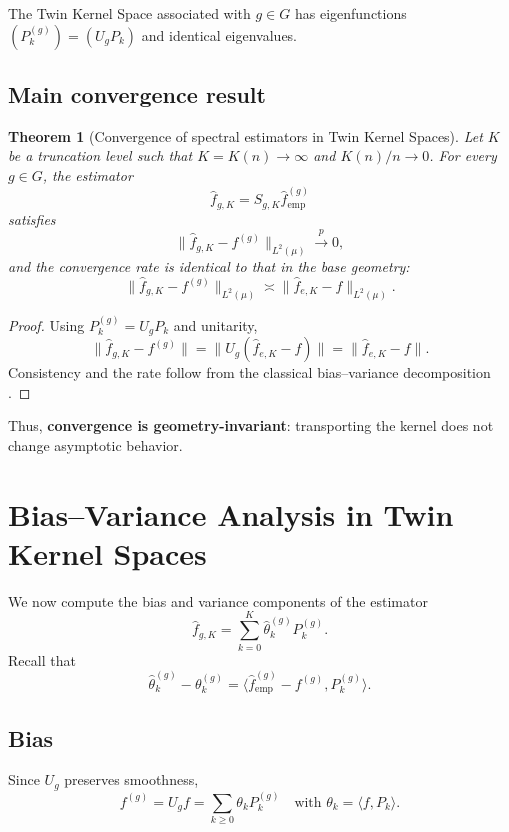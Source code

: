 \documentclass[11pt,a4paper]{article}
\newtheorem{theorem}{Theorem}[section]
\newcommand{\ip}[2]{\langle #1, #2 \rangle}
\begin{document}
The Twin Kernel Space associated with $g \in G$ has eigenfunctions $(P_k^{(g)}) = (U_g P_k)$ and identical eigenvalues.

\subsection{Main convergence result}

\begin{theorem}[Convergence of spectral estimators in Twin Kernel Spaces]\label{thm:convergence}
Let $K$ be a truncation level such that $K = K(n) \to \infty$ and $K(n)/n \to 0$. For every $g \in G$, the estimator
\[
\hat{f}_{g,K} = S_{g,K} \hat{f}_{\mathrm{emp}}^{(g)}
\]
satisfies
\[
\|\hat{f}_{g,K} - f^{(g)}\|_{L^2(\mu)} \xrightarrow{p} 0,
\]
and the convergence rate is identical to that in the base geometry:
\[
\|\hat{f}_{g,K} - f^{(g)}\|_{L^2(\mu)} \asymp \|\hat{f}_{e,K} - f\|_{L^2(\mu)}.
\]
\end{theorem}

\begin{proof}
Using $P_k^{(g)} = U_g P_k$ and unitarity,
\[
\|\hat{f}_{g,K} - f^{(g)}\| = \|U_g(\hat{f}_{e,K} - f)\| = \|\hat{f}_{e,K} - f\|.
\]
Consistency and the rate follow from the classical bias--variance decomposition \citep{Tsybakov2009}.
\end{proof}

Thus, \textbf{convergence is geometry-invariant}: transporting the kernel does not change asymptotic behavior.

\section{Bias--Variance Analysis in Twin Kernel Spaces}\label{sec:bias_variance}

We now compute the bias and variance components of the estimator
\[
\hat{f}_{g,K} = \sum_{k=0}^{K} \hat{\theta}_k^{(g)} P_k^{(g)}.
\]
Recall that
\[
\hat{\theta}_k^{(g)} - \theta_k^{(g)} = \ip{\hat{f}_{\mathrm{emp}}^{(g)} - f^{(g)}}{P_k^{(g)}}.
\]

\subsection{Bias}

Since $U_g$ preserves smoothness,
\[
f^{(g)} = U_g f = \sum_{k \geq 0} \theta_k P_k^{(g)} \quad \text{with } \theta_k = \ip{f}{P_k}.
\]
\end{document}
